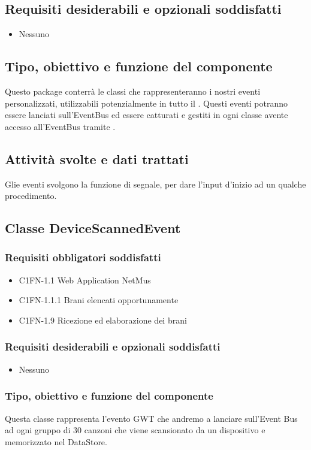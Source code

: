 \subsection*{Requisiti desiderabili e opzionali soddisfatti}
\begin{itemize}
    \item Nessuno
\end{itemize}
\subsection*{Tipo, obiettivo e funzione del componente}
Questo package conterr\`a le classi che rappresenteranno i nostri eventi
personalizzati, utilizzabili potenzialmente in tutto il .
Questi eventi potranno essere lanciati sull'EventBus ed essere catturati e
gestiti in ogni classe avente accesso all'EventBus tramite .
\subsection*{Attivit\`a svolte e dati trattati}
Glie eventi svolgono la funzione di segnale, per dare l'input d'inizio ad un
qualche procedimento.

\subsection{Classe DeviceScannedEvent}
\subsubsection*{Requisiti obbligatori soddisfatti}
\begin{itemize}
    \item C1FN-1.1 Web Application NetMus
    \item C1FN-1.1.1 Brani elencati opportunamente
    \item C1FN-1.9 Ricezione ed elaborazione dei brani
\end{itemize}
\subsubsection*{Requisiti desiderabili e opzionali soddisfatti}
\begin{itemize}
    \item Nessuno
\end{itemize}
\subsubsection*{Tipo, obiettivo e funzione del componente}
Questa classe rappresenta l'evento GWT che andremo a lanciare sull'Event Bus
ad ogni gruppo di 30 canzoni che viene scansionato
da un dispositivo e memorizzato nel DataStore. 
